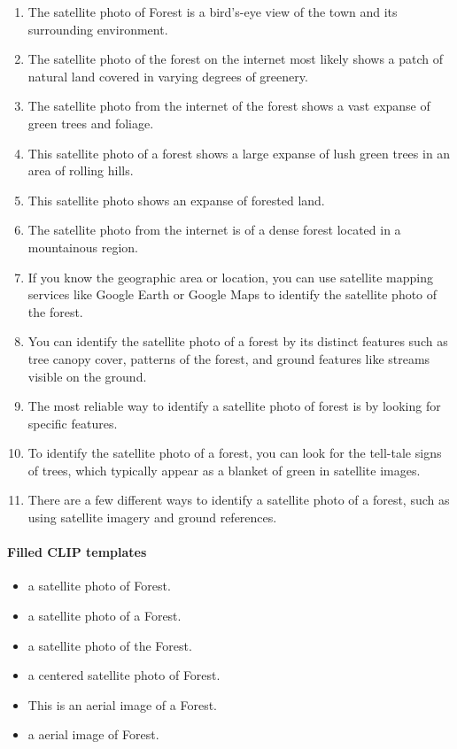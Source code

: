 \documentclass[11pt]{article}
\begin{document}
\begin{enumerate}
\item The satellite photo of Forest is a bird's-eye view of the town and its surrounding environment.
\item The satellite photo of the forest on the internet most likely shows a patch of natural land covered in varying degrees of greenery.
\item The satellite photo from the internet of the forest shows a vast expanse of green trees and foliage.
\item This satellite photo of a forest shows a large expanse of lush green trees in an area of rolling hills.
\item This satellite photo shows an expanse of forested land.
\item The satellite photo from the internet is of a dense forest located in a mountainous region.
\item If you know the geographic area or location, you can use satellite mapping services like Google Earth or Google Maps to identify the satellite photo of the forest.
\item
You can identify the satellite photo of a forest by its distinct features such as tree canopy cover, patterns of the forest, and ground features like streams visible on the ground.
\item The most reliable way to identify a satellite photo of forest is by looking for specific features.
\item To identify the satellite photo of a forest, you can look for the tell-tale signs of trees, which typically appear as a blanket of green in satellite images.
\item There are a few different ways to identify a satellite photo of a forest, such as using satellite imagery and ground references.
\end{enumerate}
\paragraph{Filled CLIP templates}\begin{itemize}
\item a satellite photo of Forest.
\item a satellite photo of a Forest.
\item a satellite photo of the Forest.
\item a centered satellite photo of Forest.
\item This is an aerial image of a Forest.
\item a aerial image of Forest.
\end{itemize}
\end{document}
